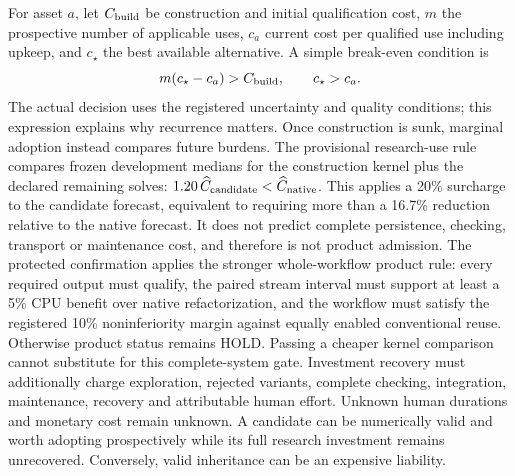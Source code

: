For asset $a$, let $C_{\rm build}$ be construction and initial qualification cost, $m$ the prospective number
of applicable uses, $c_a$ current cost per qualified use including upkeep, and $c_\star$ the best available
alternative. A simple break-even condition is
\begin{equation}
 m(c_\star-c_a)>C_{\rm build},\qquad c_\star>c_a.
 \label{eq:breakeven}
\end{equation}
The actual decision uses the registered uncertainty and quality conditions; this expression explains why
recurrence matters. Once construction is sunk, marginal adoption instead compares future burdens.
The provisional research-use rule compares frozen development medians for the construction kernel plus
the declared remaining solves: $1.20\,\widehat C_{\rm candidate}<\widehat C_{\rm native}$.
This applies a 20\% surcharge to the candidate forecast, equivalent to requiring more than a 16.7\% reduction
relative to the native forecast. It does not
predict complete persistence, checking, transport or maintenance cost, and therefore is not product admission.
The protected confirmation applies the stronger whole-workflow product rule: every required output must
qualify, the paired stream interval must support at least a 5\% CPU benefit over native refactorization,
and the workflow must satisfy the registered 10\% noninferiority margin against equally enabled conventional
reuse. Otherwise product status remains HOLD. Passing a cheaper kernel comparison cannot substitute for
this complete-system gate.
Investment recovery must additionally charge exploration, rejected variants, complete checking, integration,
maintenance, recovery and attributable human effort. Unknown human durations and monetary cost remain unknown.
A candidate can be numerically valid and worth adopting prospectively while its full research investment
remains unrecovered. Conversely, valid inheritance can be an expensive liability.
